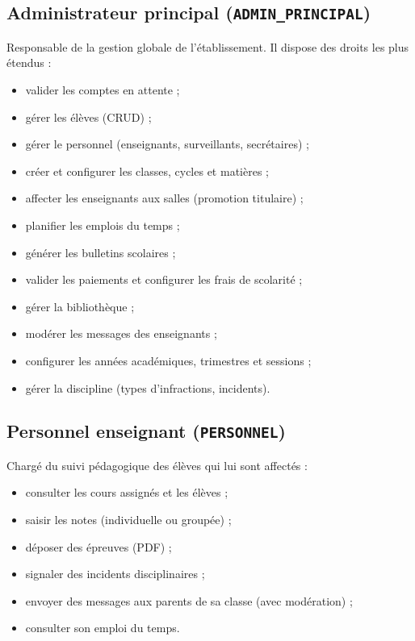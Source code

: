 \documentclass[12pt, a4paper]{report}
\begin{document}
\subsection{Administrateur principal (\texttt{ADMIN\_PRINCIPAL})}
Responsable de la gestion globale de l'établissement. Il dispose des droits les plus étendus :
\begin{itemize}[noitemsep]
    \item valider les comptes en attente ;
    \item gérer les élèves (CRUD) ;
    \item gérer le personnel (enseignants, surveillants, secrétaires) ;
    \item créer et configurer les classes, cycles et matières ;
    \item affecter les enseignants aux salles (promotion titulaire) ;
    \item planifier les emplois du temps ;
    \item générer les bulletins scolaires ;
    \item valider les paiements et configurer les frais de scolarité ;
    \item gérer la bibliothèque ;
    \item modérer les messages des enseignants ;
    \item configurer les années académiques, trimestres et sessions ;
    \item gérer la discipline (types d'infractions, incidents).
\end{itemize}

\subsection{Personnel enseignant (\texttt{PERSONNEL})}
Chargé du suivi pédagogique des élèves qui lui sont affectés :
\begin{itemize}[noitemsep]
    \item consulter les cours assignés et les élèves ;
    \item saisir les notes (individuelle ou groupée) ;
    \item déposer des épreuves (PDF) ;
    \item signaler des incidents disciplinaires ;
    \item envoyer des messages aux parents de sa classe (avec modération) ;
    \item consulter son emploi du temps.
\end{itemize}
\end{document}
